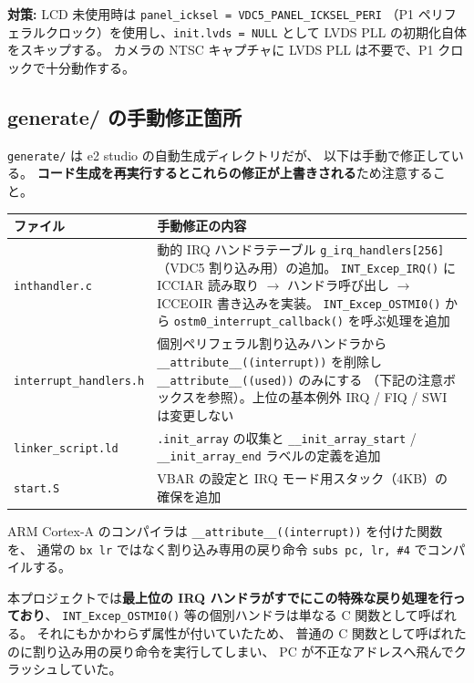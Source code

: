 \documentclass[a4paper,11pt,dvipdfmx]{jsarticle}
\begin{document}
\textbf{対策:} LCD 未使用時は \texttt{panel\_icksel = VDC5\_PANEL\_ICKSEL\_PERI}
（P1 ペリフェラルクロック）を使用し、\texttt{init.lvds = NULL} として
LVDS PLL の初期化自体をスキップする。
カメラの NTSC キャプチャに LVDS PLL は不要で、P1 クロックで十分動作する。

\subsection{generate/ の手動修正箇所}\label{sec:generate}

\texttt{generate/} は e2 studio の自動生成ディレクトリだが、
以下は手動で修正している。
\textbf{コード生成を再実行するとこれらの修正が上書きされる}ため注意すること。

\begin{tabularx}{\textwidth}{l X}
\toprule
\textbf{ファイル} & \textbf{手動修正の内容} \\
\midrule
\texttt{inthandler.c} & 動的 IRQ ハンドラテーブル \texttt{g\_irq\_handlers[256]}（VDC5 割り込み用）の追加。
  \texttt{INT\_Excep\_IRQ()} に ICCIAR 読み取り $\rightarrow$ ハンドラ呼び出し $\rightarrow$
  ICCEOIR 書き込みを実装。
  \texttt{INT\_Excep\_OSTMI0()} から \texttt{ostm0\_interrupt\_callback()} を呼ぶ処理を追加 \\
\texttt{interrupt\_handlers.h} & 個別ペリフェラル割り込みハンドラから
  \texttt{\_\_attribute\_\_((interrupt))} を削除し \texttt{\_\_attribute\_\_((used))} のみにする
  （下記の注意ボックスを参照）。上位の基本例外 IRQ / FIQ / SWI は変更しない \\
\texttt{linker\_script.ld} & \texttt{.init\_array} の収集と
  \texttt{\_\_init\_array\_start} / \texttt{\_\_init\_array\_end} ラベルの定義を追加 \\
\texttt{start.S} & VBAR の設定と IRQ モード用スタック（4KB）の確保を追加 \\
\bottomrule
\end{tabularx}

\begin{cautionbox}
ARM Cortex-A のコンパイラは \texttt{\_\_attribute\_\_((interrupt))} を付けた関数を、
通常の \texttt{bx lr} ではなく割り込み専用の戻り命令 \texttt{subs pc, lr, \#4} でコンパイルする。

本プロジェクトでは\textbf{最上位の IRQ ハンドラがすでにこの特殊な戻り処理を行っており}、
\texttt{INT\_Excep\_OSTMI0()} 等の個別ハンドラは単なる C 関数として呼ばれる。
それにもかかわらず属性が付いていたため、
普通の C 関数として呼ばれたのに割り込み用の戻り命令を実行してしまい、
PC が不正なアドレスへ飛んでクラッシュしていた。
\end{cautionbox}
\end{document}

